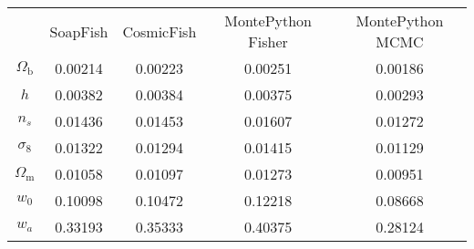 \begin{table}
\centering
\begin{tabular}{|c|c|c|c|c|}
 & SoapFish & CosmicFish & MontePython Fisher & MontePython MCMC \\
$\Omega_\mathrm{b}$ & 0.00214 & 0.00223 & 0.00251 & 0.00186 \\
$h$ & 0.00382 & 0.00384 & 0.00375 & 0.00293 \\
$n_s$ & 0.01436 & 0.01453 & 0.01607 & 0.01272 \\
$\sigma_8$ & 0.01322 & 0.01294 & 0.01415 & 0.01129 \\
$\Omega_\mathrm{m}$ & 0.01058 & 0.01097 & 0.01273 & 0.00951 \\
$w_0$ & 0.10098 & 0.10472 & 0.12218 & 0.08668 \\
$w_a$ & 0.33193 & 0.35333 & 0.40375 & 0.28124 \\
\end{tabular}
\end{table}
